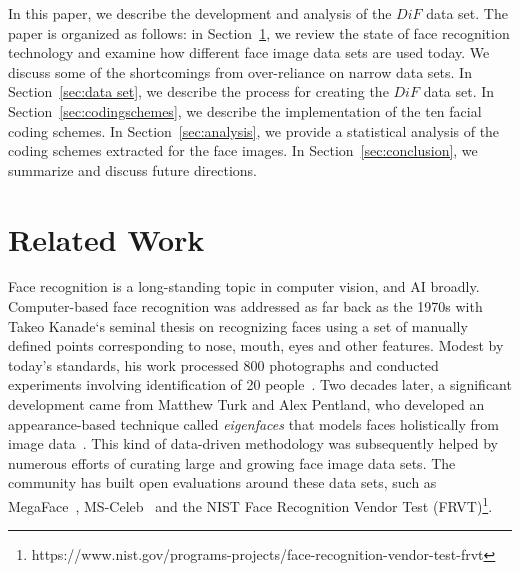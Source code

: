\documentclass[letterpaper,11pt]{article}
\begin{document}
In this paper, we describe the development and analysis of the $DiF$ data set.  The paper is organized as follows: in Section~\ref{sec:related}, we review the state of face recognition technology and examine how different face image data sets are used today.  We discuss some of the shortcomings from over-reliance on narrow data sets. In Section~\ref{sec:data set}, we describe the process for creating the $DiF$ data set. In Section~\ref{sec:codingschemes}, we describe the implementation of the ten facial coding schemes.  In Section~\ref{sec:analysis}, we provide a statistical analysis of the coding schemes extracted for the face images.  In Section~\ref{sec:conclusion}, we summarize and discuss future directions.

\section{Related Work} \label{sec:related}

Face recognition is a long-standing topic in computer vision, and AI broadly.  Computer-based face recognition was addressed as far back as the 1970s with Takeo Kanade`s seminal thesis on recognizing faces using a set of manually defined points corresponding to nose, mouth, eyes and other features.  Modest by today's standards, his work processed $800$ photographs and conducted experiments involving identification of 20 people~\cite{kanade73}.  Two decades later, a  significant development came from Matthew Turk and Alex Pentland, who developed an appearance-based technique called {\em eigenfaces} that models faces holistically from image data~\cite{turk91}.  This kind of data-driven methodology was subsequently helped by numerous efforts of curating large and growing face image data sets.
The community has built open evaluations around these data sets, such as MegaFace~\cite{Megaface_CVPR16}, MS-Celeb~\cite{MSCELEB1M_ECCV16} and the {NIST} Face Recognition Vendor Test (FRVT)\footnote{https://www.nist.gov/programs-projects/face-recognition-vendor-test-frvt}.  

\end{document}

